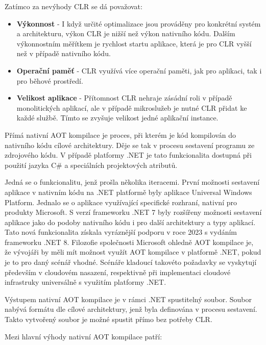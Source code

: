 Zatímco za nevýhody CLR se dá považovat:

\begin{itemize}
    \item  \textbf{Výkonnost} - I když určité optimalizace jsou prováděny pro konkrétní systém a architekturu, výkon CLR je nižší než výkon nativního kódu. Dalším výkonnostním měřítkem je rychlost startu aplikace, která je pro CLR vyšší než v případě nativního kódu.
    \item \textbf{Operační paměť} - CLR využívá více operační paměti, jak pro aplikaci, tak i pro běhové prostředí.
    \item \textbf{Velikost aplikace} - Přítomnost CLR nehraje zásádní roli v případě monolitických aplikací, ale v případě mikroslužeb je nutné CLR přidat ke každé službě. Tímto se zvyšuje velikost jedné aplikační instance.
\end{itemize}


Přímá nativní AOT kompilace je proces, při kterém je kód kompilován do nativního kódu cílové architektury. Děje se tak v procesu sestavení programu ze zdrojového kódu. V případě platformy .NET je tato funkcionalita dostupná při použití jazyka C\# a speciálních projektových atributů. 

Jedná se o funkcionalitu, jenž prošla několika iteracemi. První možnosti sestavení aplikace v nativním kódu na .NET platformě byly aplikace Universal Windows Platform. Jednalo se o aplikace využívající specifické rozhraní, nativní pro produkty Microsoft. S verzí frameworku .NET 7 byly rozšířeny možnosti sestavení aplikace jako do podoby nativního kódu i pro další architektury a typy aplikací. \cite{Pflug2023} Tato nová funkcionalita získala vyráznější podporu v roce 2023 s vydáním frameworku .NET 8. Filozofie společnosti Microsoft ohledně AOT kompilace je, že vývojáři by měli mít možnost využít AOT kompilace v platformě .NET, pokud je to pro daný scénář vhodné. Scénáře kladoucí takovéto požadavky se vyskytují především v cloudovém nasazení, respektivně při implementaci cloudové infrastruky universálně s využitím platformy .NET.

Výstupem nativní AOT kompilace je v rámci .NET spustitelný soubor. Soubor nabývá formátu dle cílové architektury, jenž byla definována v procesu sestavení. Takto vytvořený soubor je možné spustit přímo bez potřeby CLR.

Mezi hlavní výhody nativní AOT kompilace patří:

